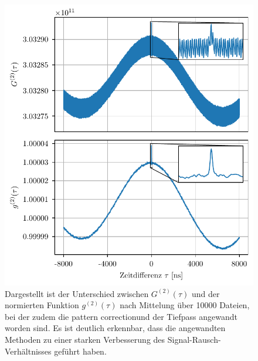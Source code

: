\begin{figure}[h]
    \centering
    \includegraphics{images/Datenaufnahme/G2_vs_g2.pdf}
    \caption{Dargestellt ist der Unterschied zwischen $G^{(2)}(\tau)$ und der normierten Funktion $g^{(2)}(\tau)$ nach Mittelung über 10000 Dateien, bei der zudem die \glqq pattern correction\grqq\;und der Tiefpass angewandt worden sind. Es ist deutlich erkennbar, dass die angewandten Methoden zu einer starken Verbesserung des Signal-Rausch-Verhältnisses geführt haben. }
    \label{fig:gemittelte G2 vs g2}
\end{figure}


